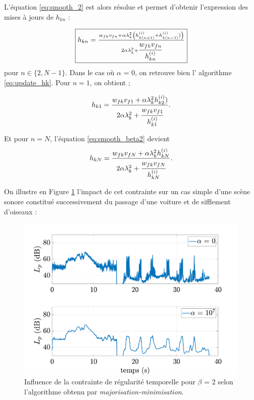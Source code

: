L'équation \ref{eq:smooth_2} est alors résolue et permet d'obtenir l'expression des mises à jours de $h_{kn}$ : 

\begin{equation}\label{eq:smooth_beta2}
\fbox{$
h_{kn} = \frac{w_{fk} v_{fn}+\alpha  \lambda_k^2 \left(h_{k(n+1)}^{(i)}+h_{k(n-1)}^{(i)})\right)}{2\alpha \lambda_k^2 + \cfrac{w_{fk} v_{fn}} {h_{kn}^{(i)}}}$}
\end{equation}
pour $n \in \lbrace 2, N-1 \rbrace$. Dans le cas où $\alpha$ = 0, on retrouve bien l' algorithme \ref{eq:update_hk}. Pour $n = 1$, on obtient ; 

\begin{equation}
h_{k1} = \frac{w_{fk} v_{f1}+\alpha \lambda_k^2 h_{k2}^{(i)})}{2\alpha \lambda_k^2 + \cfrac{w_{fk} v_{f1}}{h_{k1}^{(i)}}}.
\end{equation}

Et pour $n = N$, l'équation \ref{eq:smooth_beta2} devient 
\begin{equation}
h_{kN} = \frac{w_{fk} v_{fN}+\alpha  \lambda_k^2 h_{kN}^{(i)}}{2\alpha \lambda_k^2 + \cfrac{w_{fk} v_{fN}} {h_{kN}^{(i)}}}.
\end{equation}

On illustre en Figure \ref{fig:smooth_2} l'impact de cet contrainte sur un cas simple d'une scène sonore constitué successivement du passage d'une voiture et de sifflement d'oiseaux : 

\begin{figure}[h]
\centering
\includegraphics[width=.9\linewidth]{./figures/NMF/LpSmooth_2.pdf}
\caption{Influence de la contrainte de régularité temporelle pour $\beta$ = 2 selon l'algorithme obtenu par \textit{majorisation-minimisation}.}
\label{fig:smooth_2}
\end{figure}


